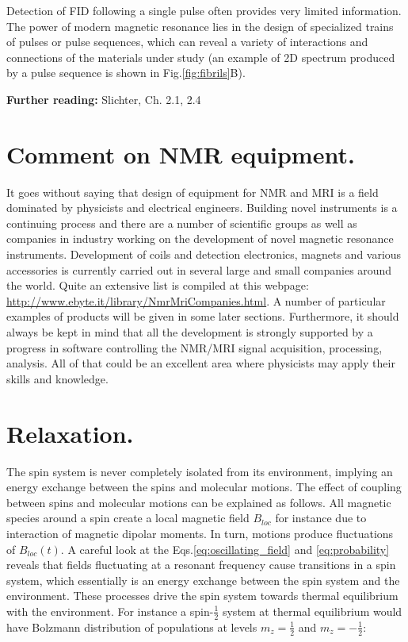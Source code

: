 \documentclass[a4paper, 12pt]{article}
\begin{document}
Detection of FID following a single pulse often provides very limited information. The power of modern magnetic resonance lies in the design of specialized trains of pulses or pulse sequences, which can reveal a variety of interactions and connections of the materials under study (an example of 2D spectrum produced by a pulse sequence is shown in Fig.\ref{fig:fibrils}B).

\textbf{Further reading:} Slichter, Ch. 2.1, 2.4 

\section{Comment on NMR equipment.}

It goes without saying that design of equipment for NMR and MRI is a field dominated by physicists and electrical engineers. Building novel instruments is a continuing process and there are a number of scientific groups as well as companies in industry working on the development of novel magnetic resonance instruments.
  Development of coils and detection electronics, magnets and various accessories is currently carried out in several large and small companies around the world. Quite an extensive list is compiled at this webpage: \url{http://www.ebyte.it/library/NmrMriCompanies.html}. A number of particular examples of products will be given in some later sections.
 Furthermore, it should always be kept in mind that all the development is strongly supported by a progress in software controlling the NMR/MRI signal acquisition, processing, analysis. All of that could be an excellent area where physicists may apply their skills and knowledge.

\section{Relaxation.}
 The spin system is never completely isolated from its environment, implying an energy exchange between the spins and molecular motions. The effect of coupling between spins and molecular motions can be explained as follows.
 All magnetic species around a spin create a local magnetic field $B_{loc}$ for instance due to interaction of magnetic dipolar moments. In turn, motions produce fluctuations of $B_{loc}(t)$. A careful look at the Eqs.\ref{eq:oscillating_field} and \ref{eq:probability} reveals that fields fluctuating at a resonant frequency cause transitions in a spin system, which essentially is an energy exchange between the spin system and the environment. These processes drive the spin system towards thermal equilibrium with the environment. For instance a spin-$\frac{1}{2}$ system at thermal equilibrium would have Bolzmann distribution of populations at levels $m_z=\frac{1}{2}$ and $m_z=-\frac{1}{2}$:
\end{document}
